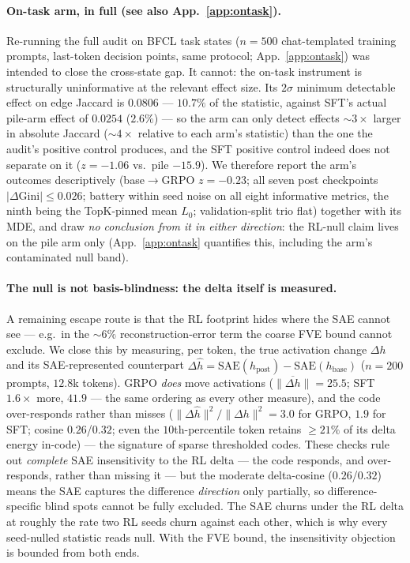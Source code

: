 \documentclass{article}
\begin{document}
\paragraph{On-task arm, in full (see also App.~\ref{app:ontask}).} Re-running the full audit on BFCL task states ($n{=}500$ chat-templated training prompts, last-token decision points, same protocol; App.~\ref{app:ontask}) was intended to close the cross-state gap. It cannot: the on-task instrument is structurally uninformative at the relevant effect size. Its $2\sigma$ minimum detectable effect on edge Jaccard is $0.0806$ --- $10.7\%$ of the statistic, against SFT's actual pile-arm effect of $0.0254$ ($2.6\%$) --- so the arm can only detect effects ${\sim}3\times$ larger in absolute Jaccard (${\sim}4\times$ relative to each arm's statistic) than the one the audit's positive control produces, and the SFT positive control indeed does not separate on it ($z=-1.06$ vs.\ pile $-15.9$). We therefore report the arm's outcomes descriptively (base$\to$GRPO $z=-0.23$; all seven post checkpoints $|\Delta\text{Gini}|\le0.026$; battery within seed noise on all eight informative metrics, the ninth being the TopK-pinned mean $L_0$; validation-split trio flat) together with its MDE, and draw \emph{no conclusion from it in either direction}: the RL-null claim lives on the pile arm only (App.~\ref{app:ontask} quantifies this, including the arm's contaminated null band).

\paragraph{The null is not basis-blindness: the delta itself is measured.} A remaining escape route is that the RL footprint hides where the SAE cannot see --- e.g.\ in the ${\sim}6\%$ reconstruction-error term the coarse FVE bound cannot exclude. We close this by measuring, per token, the true activation change $\Delta h$ and its SAE-represented counterpart $\Delta\hat h = \mathrm{SAE}(h_{\text{post}})-\mathrm{SAE}(h_{\text{base}})$ ($n{=}200$ prompts, $12.8$k tokens). GRPO \emph{does} move activations ($\overline{\|\Delta h\|}=25.5$; SFT $1.6\times$ more, $41.9$ --- the same ordering as every other measure), and the code over-responds rather than misses ($\|\Delta\hat h\|^2/\|\Delta h\|^2 = 3.0$ for GRPO, $1.9$ for SFT; cosine $0.26$/$0.32$; even the $10$th-percentile token retains $\ge21\%$ of its delta energy in-code) --- the signature of sparse thresholded codes. These checks rule out \emph{complete} SAE insensitivity to the RL delta --- the code responds, and over-responds, rather than missing it --- but the moderate delta-cosine ($0.26$/$0.32$) means the SAE captures the difference \emph{direction} only partially, so difference-specific blind spots cannot be fully excluded. The SAE churns under the RL delta at roughly the rate two RL seeds churn against each other, which is why every seed-nulled statistic reads null. With the FVE bound, the insensitivity objection is bounded from both ends.
\end{document}

